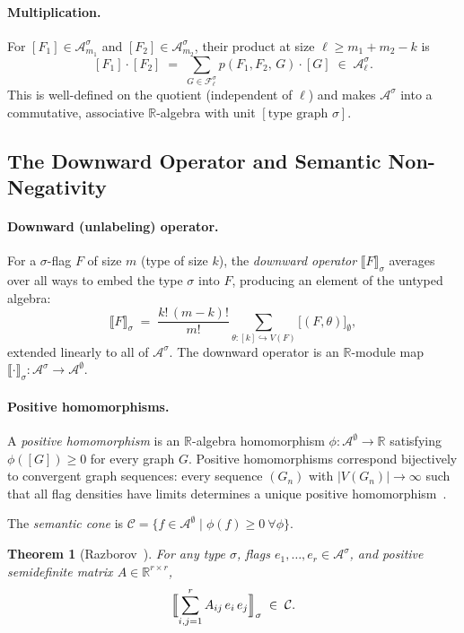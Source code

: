 \documentclass{article}
\newtheorem{theorem}{Theorem}[section]
\newcommand{\den}[2]{p(#1,\,#2)}
\begin{document}
\paragraph{Multiplication.}
For $[F_1] \in \mathcal{A}^\sigma_{m_1}$ and $[F_2] \in \mathcal{A}^\sigma_{m_2}$,
their product at size $\ell \geq m_1 + m_2 - k$ is
\[
  [F_1] \cdot [F_2]
  \;=\;
  \sum_{G \in \mathcal{F}^\sigma_\ell} \den{F_1,F_2}{G} \cdot [G]
  \;\in\; \mathcal{A}^\sigma_\ell.
\]
This is well-defined on the quotient (independent of $\ell$) and makes
$\mathcal{A}^\sigma$ into a commutative, associative $\mathbb{R}$-algebra
with unit $[\text{type graph } \sigma]$.

\subsection{The Downward Operator and Semantic Non-Negativity}

\paragraph{Downward (unlabeling) operator.}
For a $\sigma$-flag $F$ of size $m$ (type of size $k$), the \emph{downward
operator} $\llbracket F \rrbracket_\sigma$ averages over all ways to embed
the type $\sigma$ into $F$, producing an element of the untyped algebra:
\[
  \llbracket F \rrbracket_\sigma
  \;=\;
  \frac{k!\,(m-k)!}{m!}
  \sum_{\theta: [k]\hookrightarrow V(F)}
  \bigl[(F, \theta)\bigr]_\emptyset,
\]
extended linearly to all of $\mathcal{A}^\sigma$.
The downward operator is an $\mathbb{R}$-module map
$\llbracket\cdot\rrbracket_\sigma : \mathcal{A}^\sigma \to \mathcal{A}^\emptyset$.

\paragraph{Positive homomorphisms.}
A \emph{positive homomorphism} is an $\mathbb{R}$-algebra homomorphism
$\phi: \mathcal{A}^\emptyset \to \mathbb{R}$ satisfying $\phi([G]) \geq 0$
for every graph $G$.
Positive homomorphisms correspond bijectively to convergent graph sequences:
every sequence $(G_n)$ with $|V(G_n)|\to\infty$ such that all flag densities
have limits determines a unique positive homomorphism~\cite{razborov2007flag}.

The \emph{semantic cone} is
$\mathcal{C} = \{f \in \mathcal{A}^\emptyset \mid \phi(f) \geq 0\ \forall \phi\}$.

\begin{theorem}[Razborov~{\cite{razborov2007flag}}]
  \label{thm:sdp-nonneg}
  For any type $\sigma$, flags $e_1,\ldots,e_r \in \mathcal{A}^\sigma$,
  and positive semidefinite matrix $A \in \mathbb{R}^{r\times r}$,
  \[
    \Bigl\llbracket \sum_{i,j=1}^r A_{ij}\, e_i\, e_j \Bigr\rrbracket_\sigma
    \;\in\; \mathcal{C}.
  \]
\end{theorem}
\end{document}
